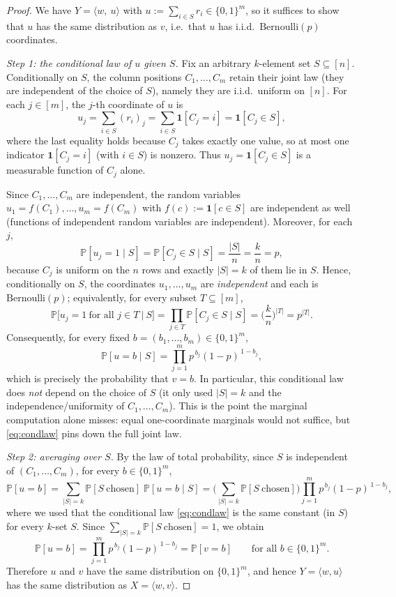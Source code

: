 \documentclass[11pt]{amsart}
\theoremstyle{plain}
\def\Pb{\mathbb{P}}
\begin{document}
\begin{proof}
We have $Y=\big\langle w,\ u\big\rangle$ with $u:=\sum_{i\in S}r_i\in\{0,1\}^m$, so
it suffices to show that $u$ has the same distribution as $v$, i.e.\ that $u$ has
i.i.d.\ $\mathrm{Bernoulli}(p)$ coordinates.

\medskip
\emph{Step 1: the conditional law of $u$ given $S$.}
Fix an arbitrary $k$-element set $S\subseteq[n]$. Conditionally on $S$, the column
positions $C_1,\dots,C_m$ retain their joint law (they are independent of the
choice of $S$), namely they are i.i.d.\ uniform on $[n]$. For each $j\in[m]$, the
$j$-th coordinate of $u$ is
\[
u_j=\sum_{i\in S}(r_i)_j=\sum_{i\in S}\mathbf 1[C_j=i]=\mathbf 1[C_j\in S],
\]
where the last equality holds because $C_j$ takes exactly one value, so at most one
indicator $\mathbf 1[C_j=i]$ (with $i\in S$) is nonzero. Thus
$u_j=\mathbf 1[C_j\in S]$ is a measurable function of $C_j$ alone.

Since $C_1,\dots,C_m$ are independent, the random variables
$u_1=f(C_1),\dots,u_m=f(C_m)$ with $f(c):=\mathbf 1[c\in S]$ are independent as
well (functions of independent random variables are independent). Moreover, for
each $j$,
\[
\Pb[u_j=1\mid S]=\Pb[C_j\in S\mid S]=\frac{|S|}{n}=\frac{k}{n}=p,
\]
because $C_j$ is uniform on the $n$ rows and exactly $|S|=k$ of them lie in $S$.
Hence, conditionally on $S$, the coordinates $u_1,\dots,u_m$ are
\emph{independent} and each is $\mathrm{Bernoulli}(p)$; equivalently, for every
subset $T\subseteq[m]$,
\[
\Pb\big[u_j=1\ \text{for all } j\in T\ \big|\ S\big]
=\prod_{j\in T}\Pb[C_j\in S\mid S]=\Big(\frac{k}{n}\Big)^{|T|}=p^{|T|}.
\]
Consequently, for every fixed $b=(b_1,\dots,b_m)\in\{0,1\}^m$,
\begin{equation}\label{eq:condlaw}
\Pb[u=b\mid S]=\prod_{j=1}^m p^{\,b_j}(1-p)^{\,1-b_j},
\end{equation}
which is precisely the probability that $v=b$. In particular, this conditional law
does \emph{not} depend on the choice of $S$ (it only used $|S|=k$ and the
independence/uniformity of $C_1,\dots,C_m$). This is the point the marginal
computation alone misses: equal one-coordinate marginals would not suffice, but
\eqref{eq:condlaw} pins down the full joint law.

\medskip
\emph{Step 2: averaging over $S$.}
By the law of total probability, since $S$ is independent of
$(C_1,\dots,C_m)$, for every $b\in\{0,1\}^m$,
\[
\Pb[u=b]=\sum_{|S|=k}\Pb[S\ \text{chosen}]\;\Pb[u=b\mid S]
=\Big(\sum_{|S|=k}\Pb[S\ \text{chosen}]\Big)\prod_{j=1}^m p^{\,b_j}(1-p)^{\,1-b_j},
\]
where we used that the conditional law \eqref{eq:condlaw} is the same constant
(in $S$) for every $k$-set $S$. Since $\sum_{|S|=k}\Pb[S\ \text{chosen}]=1$, we
obtain
\[
\Pb[u=b]=\prod_{j=1}^m p^{\,b_j}(1-p)^{\,1-b_j}=\Pb[v=b]
\qquad\text{for all } b\in\{0,1\}^m.
\]
Therefore $u$ and $v$ have the same distribution on $\{0,1\}^m$, and hence
$Y=\langle w,u\rangle$ has the same distribution as $X=\langle w,v\rangle$.
\end{proof}
\end{document}
